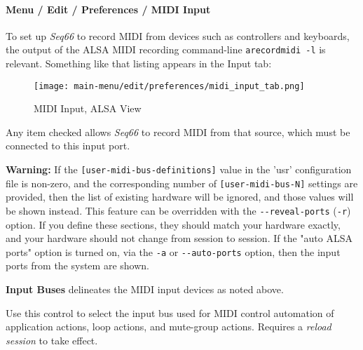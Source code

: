 
\paragraph{Menu / Edit / Preferences / MIDI Input}
\label{paragraph:menu_edit_preferences_midi_input}

   To set up \textsl{Seq66} to record MIDI from devices such as
   controllers and keyboards, the output of the ALSA MIDI recording
   command-line \texttt{arecordmidi -l} is relevant.
   Something like that listing appears in the Input tab:

\begin{figure}[H]
   \centering 
   \texttt{[image: main-menu/edit/preferences/midi\_input\_tab.png]}
   \caption{MIDI Input, ALSA View}
   \label{fig:midi_input_tab}
\end{figure}

   Any item checked allows \textsl{Seq66} to record MIDI from that source,
   which must be connected to this input port.

   \textbf{Warning:}
   If the 
   \texttt{[user-midi-bus-definitions]} value in the 'usr' configuration file
   is non-zero, and the
   corresponding number of
   \texttt{[user-midi-bus-N]} settings are provided, then
   the list of existing hardware will be ignored, and those values will be
   shown instead.
   This feature can be overridden with the
   \texttt{-{}-reveal-ports} (\texttt{-r}) option.
   If you define these sections, they should match your
   hardware exactly, and your hardware should not change from session to
   session.
   If the "auto ALSA ports" option is turned on, via the \texttt{-a} or
   \texttt{-{}-auto-ports} option, then
   the input ports from the system are shown.

   \setcounter{ItemCounter}{0}      %

   \textbf{Input Buses} delineates the MIDI input devices as noted above.

   Use this control to select the input bus used for MIDI control automation of 
   application actions, loop actions, and mute-group actions.
   Requires a \textsl{reload session} to take effect.

